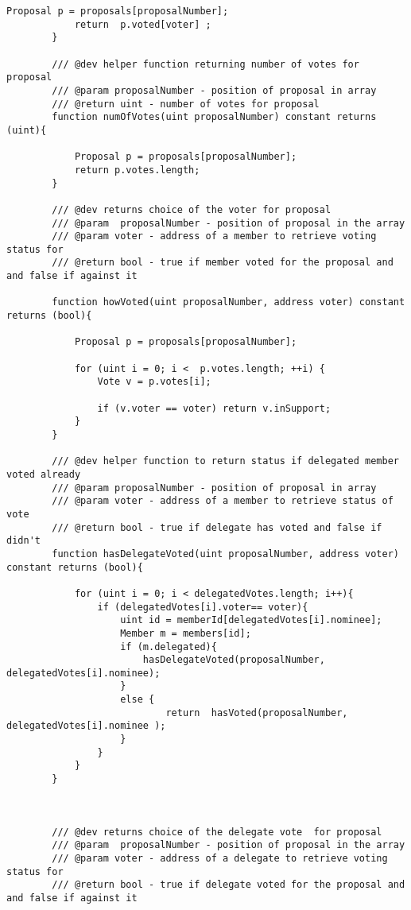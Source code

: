 \documentclass{article}
\begin{document}
\begin{lstlisting}[style=MyCStyle]
            Proposal p = proposals[proposalNumber];
            return  p.voted[voter] ;
        }

        /// @dev helper function returning number of votes for proposal
        /// @param proposalNumber - position of proposal in array
        /// @return uint - number of votes for proposal
        function numOfVotes(uint proposalNumber) constant returns (uint){

            Proposal p = proposals[proposalNumber];
            return p.votes.length;
        }

        /// @dev returns choice of the voter for proposal
        /// @param  proposalNumber - position of proposal in the array
        /// @param voter - address of a member to retrieve voting status for
        /// @return bool - true if member voted for the proposal and and false if against it

        function howVoted(uint proposalNumber, address voter) constant returns (bool){

            Proposal p = proposals[proposalNumber];

            for (uint i = 0; i <  p.votes.length; ++i) {
                Vote v = p.votes[i];

                if (v.voter == voter) return v.inSupport;
            }
        }

        /// @dev helper function to return status if delegated member voted already
        /// @param proposalNumber - position of proposal in array
        /// @param voter - address of a member to retrieve status of vote
        /// @return bool - true if delegate has voted and false if didn't
        function hasDelegateVoted(uint proposalNumber, address voter) constant returns (bool){

            for (uint i = 0; i < delegatedVotes.length; i++){
                if (delegatedVotes[i].voter== voter){
                    uint id = memberId[delegatedVotes[i].nominee];
                    Member m = members[id];
                    if (m.delegated){
                        hasDelegateVoted(proposalNumber, delegatedVotes[i].nominee);
                    }
                    else {
                            return  hasVoted(proposalNumber, delegatedVotes[i].nominee );
                    }
                }
            }
        }



        /// @dev returns choice of the delegate vote  for proposal
        /// @param  proposalNumber - position of proposal in the array
        /// @param voter - address of a delegate to retrieve voting status for
        /// @return bool - true if delegate voted for the proposal and and false if against it


\end{lstlisting}
\end{document}
